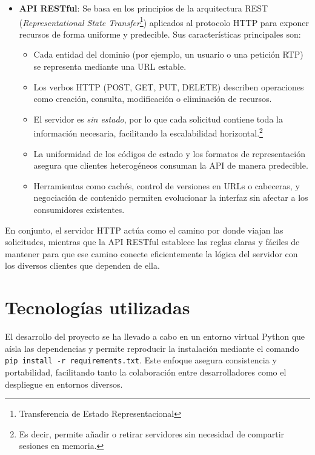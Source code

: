 \begin{itemize}
    \item \textbf{API RESTful}: Se basa en los principios de la arquitectura REST (\textit{Representational State Transfer}\footnote{Transferencia de Estado Representacional}) aplicados al protocolo HTTP para exponer recursos de forma uniforme y predecible. Sus características principales son:
    \begin{itemize}
        \item Cada entidad del dominio (por ejemplo, un usuario o una petición RTP) se representa mediante una URL estable.
        \item Los verbos HTTP (POST, GET, PUT, DELETE) describen operaciones como creación, consulta, modificación o eliminación de recursos.
        \item El servidor es \textit{sin estado}, por lo que cada solicitud contiene toda la información necesaria, facilitando la escalabilidad horizontal.\footnote{Es decir, permite añadir o retirar servidores sin necesidad de compartir sesiones en memoria.}
        \item La uniformidad de los códigos de estado y los formatos de representación asegura que clientes heterogéneos consuman la API de manera predecible.
        \item Herramientas como cachés, control de versiones en URLs o cabeceras, y negociación de contenido permiten evolucionar la interfaz sin afectar a los consumidores existentes.
    \end{itemize}
\end{itemize}

En conjunto, el servidor HTTP actúa como el camino por donde viajan las solicitudes, mientras que la API RESTful establece las reglas claras y fáciles de mantener para que ese camino conecte eficientemente la lógica del servidor con los diversos clientes que dependen de ella.
\section{Tecnologías utilizadas}
\label{subsec:Herramientas de desarrollo}
El desarrollo del proyecto se ha llevado a cabo en un entorno virtual Python que aísla las dependencias y permite reproducir la instalación mediante el comando \texttt{pip install -r requirements.txt}. Este enfoque asegura consistencia y portabilidad, facilitando tanto la colaboración entre desarrolladores como el despliegue en entornos diversos.

